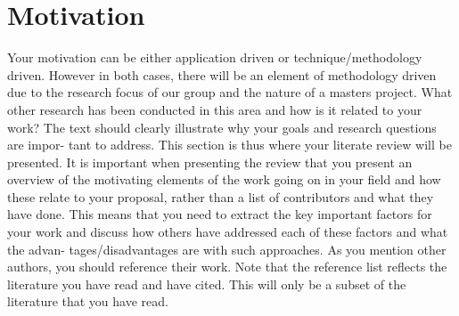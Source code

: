\section{Motivation}
\label{section:BT:Motivation}


Your motivation can be either application driven or technique/methodology driven.
However in both cases, there will be an element of methodology driven due to 
the research focus of our group and the nature of a masters project. What other
research has been conducted in this area and how is it related to your work? The
text should clearly illustrate why your goals and research questions are impor-
tant to address. This section is thus where your literate review will be presented.
It is important when presenting the review that you present an overview of the
motivating elements of the work going on in your field and how these relate to
your proposal, rather than a list of contributors and what they have done. This
means that you need to extract the key important factors for your work and
discuss how others have addressed each of these factors and what the advan-
tages/disadvantages are with such approaches. As you mention other authors,
you should reference their work. Note that the reference list reflects the literature
you have read and have cited. This will only be a subset of the literature that
you have read.
